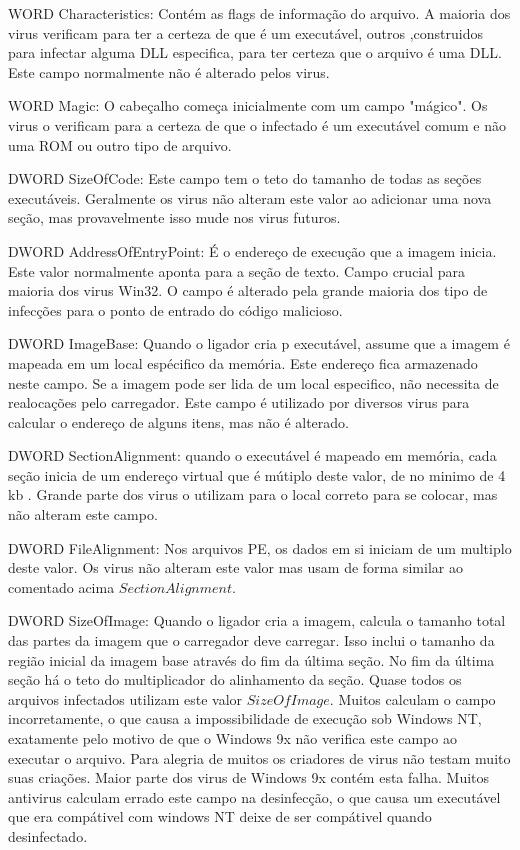WORD Characteristics: Contém as flags de informação do arquivo. A maioria dos virus
 verificam para ter a certeza de que é um executável, outros ,construidos para infectar
 alguma DLL especifica, para ter certeza que o arquivo é uma DLL. Este campo normalmente
 não é alterado pelos virus.

WORD Magic: O cabeçalho começa inicialmente com um campo "mágico". Os virus o verificam
 para a certeza de que o infectado é um executável comum e não uma ROM ou outro tipo de arquivo.

DWORD SizeOfCode: Este campo tem o teto do tamanho de todas as seções executáveis.
 Geralmente os virus não alteram este valor ao adicionar uma nova seção, mas provavelmente
 isso mude nos virus futuros.

DWORD AddressOfEntryPoint:  É o endereço  de execução que a imagem inicia. Este valor
 normalmente aponta para a seção de texto. Campo crucial para maioria dos virus Win32.
 O campo é alterado pela grande maioria dos tipo de infecções para o ponto de entrado do código malicioso.
 
DWORD ImageBase: Quando o ligador cria p executável, assume que a imagem é mapeada em um local espécifico da memória.
 Este endereço fica armazenado neste campo. Se a imagem pode ser lida de um local especifico, não necessita de realocações pelo carregador.
 Este campo é utilizado por diversos virus para calcular o endereço de alguns itens, mas não é alterado.

DWORD SectionAlignment: quando o executável é mapeado em memória, cada seção inicia de um endereço virtual que é mútiplo deste valor, de no minimo de 4 kb . Grande parte
 dos virus o utilizam para o local correto para se colocar, mas não alteram este campo.

DWORD FileAlignment: Nos arquivos PE, os dados em si iniciam de um multiplo deste valor. Os virus não alteram este valor mas usam de forma similar ao comentado acima \(SectionAlignment\).

DWORD SizeOfImage: Quando o ligador cria a imagem, calcula o tamanho total das partes da imagem que o carregador deve carregar.
 Isso inclui o tamanho da região inicial da imagem base através do fim da última seção. No fim da última seção há o teto do multiplicador do alinhamento da seção.
 Quase todos os arquivos infectados utilizam este valor \(SizeOfImage\). Muitos calculam o campo incorretamente, o que causa a impossibilidade de execução sob Windows NT,
 exatamente pelo motivo de que o Windows 9x não verifica este campo ao executar o arquivo. Para alegria de muitos os criadores de virus não testam muito suas criações. Maior parte
 dos virus de Windows 9x contém esta falha. Muitos antivirus calculam errado este campo na desinfecção, o que causa um executável que era compátivel com windows NT deixe de ser compátivel 
 quando desinfectado.

